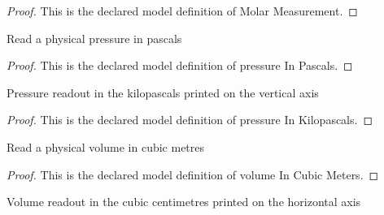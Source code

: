 \begin{proof}
  This is the declared model definition of Molar Measurement.
\end{proof}
\begin{definition}
  \label{def:physics:phyx-mini-0434:phyxminiproblems-problemphyxmini0434-pressureinpascals}
  Read a physical pressure in pascals
\end{definition}
\begin{proof}
  This is the declared model definition of pressure In Pascals.
\end{proof}
\begin{definition}
  \label{def:physics:phyx-mini-0434:phyxminiproblems-problemphyxmini0434-pressureinkilopascals}
  Pressure readout in the kilopascals printed on the vertical axis
\end{definition}
\begin{proof}
  This is the declared model definition of pressure In Kilopascals.
\end{proof}
\begin{definition}
  \label{def:physics:phyx-mini-0434:phyxminiproblems-problemphyxmini0434-volumeincubicmeters}
  Read a physical volume in cubic metres
\end{definition}
\begin{proof}
  This is the declared model definition of volume In Cubic Meters.
\end{proof}
\begin{definition}
  \label{def:physics:phyx-mini-0434:phyxminiproblems-problemphyxmini0434-volumeincubiccentimeters}
  Volume readout in the cubic centimetres printed on the horizontal axis
\end{definition}
